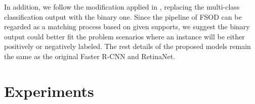 \documentclass[journal]{IEEEtran}
\begin{document}
In addition, we follow the modification applied in \cite{fan2020few}, replacing the multi-class classification output with the binary one.
Since the pipeline of FSOD can be regarded as a matching process based on given supports, we suggest the binary output could better fit the problem scenarios where an instance will be either positively or negatively labeled.
The rest details of the proposed models remain the same as the original Faster R-CNN and RetinaNet.
\begin{table}[t!]
    \centering
    \caption{The performance on novel categories of COCO. All the models are trained on base categories and then fine-tuned on a small set of novel samples (, 10 shots of each category). After fine-tuning, models will be evaluated on the novel classes. ``-'': no reported results. 
    }
    \label{tab:reported}
\end{table}



\section{Experiments}
\end{document}
